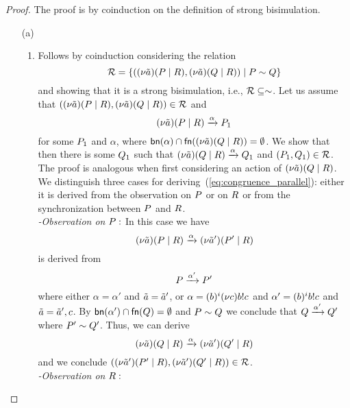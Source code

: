 \begin{proof}
The proof is by coinduction on the definition of strong bisimulation.
\begin{itemize}
\item [(a)]
\begin{enumerate}
\item Follows by coinduction considering the relation
\[
{\cal R}=\{((\nu \tilde{a})(P\;|\;R), (\nu \tilde{a}) (Q\;|\;R)) \;|\; P\sim Q\}
\]
and showing that it is a strong bisimulation, i.e., ${\cal R}\subseteq \sim$. 
Let us assume that $((\nu \tilde{a})(P\;|\;R), (\nu \tilde{a}) (Q\;|\;R))\in{\cal R}$ and  
\begin{equation}\label{eq:congruence_parallel}
(\nu \tilde{a})(P\;|\;R)\xrightarrow{\alpha} P_1
\end{equation} 
for some $P_1$ and $\alpha$, where $\mathsf{bn}(\alpha)\cap\mathsf{fn}((\nu \tilde{a}) (Q\;|\;R))=\emptyset$. 
We show that then there is some $Q_1$ such that $(\nu \tilde{a}) (Q\;|\;R)\xrightarrow{\alpha}Q_1$ and $(P_1,Q_1)\in{\cal R}$. The proof is analogous when first considering an action of $(\nu \tilde{a})(Q\;|\;R)$. %
We distinguish three cases for deriving~(\ref{eq:congruence_parallel}): either it is derived from the observation on $P$ or on $R$ or from the synchronization between $P$ and $R$.
\\
\emph{-Observation on} $P:$
In this case we have
\[
(\nu \tilde{a})(P\;|\;R)\xrightarrow{\alpha}(\nu \tilde{a}')(P'\;|\;R)
\]
is derived from 
\[
P\xrightarrow{\alpha'}P'
\]
where either $\alpha=\alpha'$ and $\tilde{a}=\tilde{a}'$, or $\alpha={(b)^i}(\nu c)b!c$ and $\alpha'={(b)^i}b!c$ and $\tilde{a}=\tilde{a}',{c}$. By $\mathsf{bn}(\alpha')\cap\mathsf{fn}(Q)=\emptyset$ and $P\sim Q$ we conclude that $Q\xrightarrow{\alpha'}Q'$ where $P'\sim Q'$. Thus, we can derive 
\[
(\nu \tilde{a})(Q\;|\;R)\xrightarrow{\alpha}(\nu \tilde{a}')(Q'\;|\;R)
\]
and we conclude $((\nu \tilde{a}')(P'\;|\;R), (\nu \tilde{a}')(Q'\;|\;R))\in{\cal R}$.
\\
\emph{-Observation on} $R:$ 

\end{enumerate}
\end{itemize}
\end{proof}
